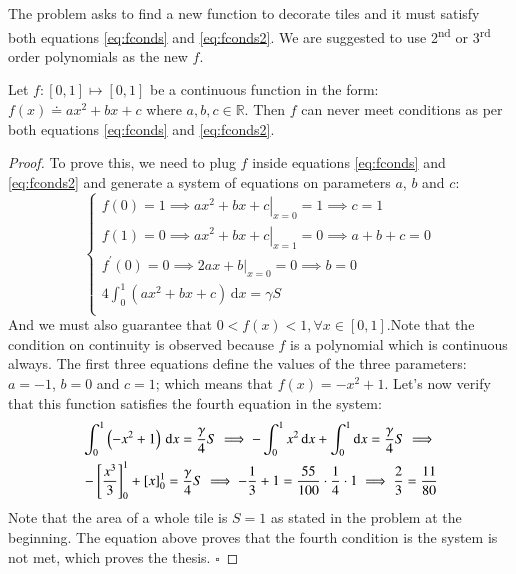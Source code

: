 The problem asks to find a new function to decorate tiles and it must 
satisfy both equations \ref{eq:fconds} and \ref{eq:fconds2}.
We are suggested to use 2\textsuperscript{nd} or 3\textsuperscript{rd} 
order polynomials as the new $f$.

\begin{proposition}
\label{the:2degpoly}
Let $f:[0,1] \mapsto [0,1]$ be a continuous function in the form: 
$f(x) \doteq ax^2+bx+c$ where $a,b,c \in \mathbb{R}$. 
Then $f$ can never meet conditions as per both
equations \ref{eq:fconds} and \ref{eq:fconds2}.
\begin{proof}
To prove this, we need to plug $f$ inside equations \ref{eq:fconds} and 
\ref{eq:fconds2} and generate a system of equations on parameters $a$, 
$b$ and $c$:
\begin{equation*}
\begin{cases}
f(0)=1 \implies \left. ax^2+bx+c \right|_{x=0} = 1 \implies c = 1 \\
f(1)=0 \implies \left. ax^2+bx+c \right|_{x=1} = 0 \implies a+b+c=0\\
f^\prime(0) = 0 \implies \left. 2ax + b \right|_{x=0} = 0 \implies b = 0 \\
4 \int^{1}_{0} \left( ax^2+bx+c \right) \, \mathrm{d} x = \gamma S \\
\end{cases}
\end{equation*}
And we must also guarantee that $0 < f(x) < 1, \forall x \in [0,1]. 
$Note that the condition on continuity is observed because $f$ is a polynomial which
is continuous always. 
The first three equations define the values of the three parameters: 
$a=-1$, $b=0$ and $c=1$; which means that $f(x) = -x^2 + 1$. Let's now
verify that this function satisfies the fourth equation in the system:
\begin{align*}
&\int^{1}_{0} \left( -x^2+1 \right) \, \mathrm{d} x = \frac{\gamma}{4} S
\implies
-\int^{1}_{0} x^2 \, \mathrm{d} x + \int^{1}_{0} \mathrm{d} x = 
        \frac{\gamma}{4} S \implies \notag\\
&- \left[\frac{x^3}{3}\right]_0^1 + \left[x\right]_0^1 = \frac{\gamma}{4} S
\implies -\frac{1}{3} + 1 = \frac{55}{100} \cdot \frac{1}{4} \cdot 1
\implies \frac{2}{3} = \frac{11}{80}
\end{align*}
Note that the area of a whole tile is $S=1$ as stated in the problem at the beginning.
The equation above proves that the fourth condition is the system is not met, which
proves the thesis.
$\square$
\end{proof}
\end{proposition}
